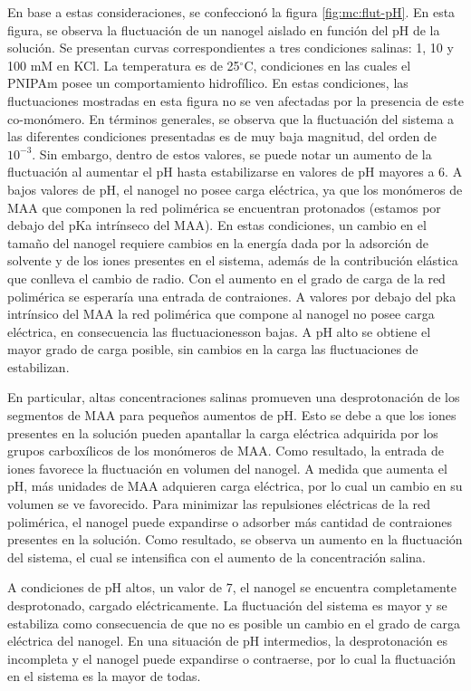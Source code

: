 	En base a estas consideraciones, se confeccion\'o la figura \ref{fig:mc:flut-pH}. En esta figura, se observa la fluctuaci\'on de un nanogel aislado en funci\'on del pH de la soluci\'on. Se presentan curvas correspondientes a tres condiciones salinas: 1, 10 y 100 mM en KCl. La temperatura es de 25$^\circ$C, condiciones en las cuales el PNIPAm posee un comportamiento hidrof\'ilico. En estas condiciones, las fluctuaciones mostradas en esta figura no se ven afectadas por la presencia de este co-mon\'omero.
	En t\'erminos generales, se observa que la fluctuaci\'on del sistema a las diferentes condiciones presentadas es de muy baja magnitud, del orden de $10^{-3}$. Sin embargo, dentro de estos valores, se puede notar un aumento de la fluctuaci\'on al aumentar el pH hasta estabilizarse en valores de pH mayores a 6.
	A bajos valores de pH, el nanogel no posee carga el\'ectrica, ya que los mon\'omeros de MAA que componen la red polim\'erica se encuentran protonados (estamos por debajo del pKa intr\'inseco del MAA). En estas condiciones, un cambio en el tama\~no del nanogel requiere cambios en la energ\'ia dada por la adsorci\'on de solvente y de los iones presentes en el sistema, adem\'as de la contribuci\'on el\'astica que conlleva el cambio de radio.
	Con el aumento en el grado de carga de la red polim\'erica se esperar\'ia una entrada de contraiones. A valores por debajo del pka intr\'insico del MAA la red polim\'erica que compone al nanogel no posee carga el\'ectrica, en consecuencia las fluctuacionesson bajas. A pH alto se obtiene el mayor grado de carga posible, sin cambios en la carga las fluctuaciones de estabilizan.
	
	En particular, altas concentraciones salinas promueven una desprotonaci\'on de los segmentos de MAA para peque\~nos aumentos de pH. Esto se debe a que los iones presentes en la soluci\'on pueden apantallar la carga el\'ectrica adquirida por los grupos carbox\'ilicos de los mon\'omeros de MAA. Como resultado, la entrada de iones favorece la fluctuaci\'on en volumen del nanogel.
	A medida que aumenta el pH, m\'as unidades de MAA adquieren carga el\'ectrica, por lo cual un cambio en su volumen se ve favorecido. Para minimizar las repulsiones el\'ectricas de la red polim\'erica, el nanogel puede expandirse o adsorber m\'as cantidad de contraiones presentes en la soluci\'on. Como resultado, se observa un aumento en la fluctuaci\'on del sistema, el cual se intensifica con el aumento de la concentraci\'on salina.
	
	A condiciones de pH altos, un valor de 7, el nanogel se encuentra completamente desprotonado, cargado el\'ectricamente. La fluctuaci\'on del sistema es mayor y se estabiliza como consecuencia de que no es posible un cambio en el grado de carga el\'ectrica del nanogel. 
	En una situaci\'on de pH intermedios, la desprotonaci\'on es incompleta y el nanogel puede expandirse o contraerse, por lo cual la fluctuaci\'on en el sistema es la mayor de todas.
	
